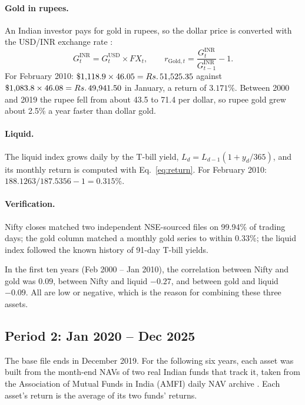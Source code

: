 \paragraph{Gold in rupees.} An Indian investor pays for gold in rupees, so the dollar price is
converted with the USD/INR exchange rate \citep{fred}:
\begin{equation}
  G^{\text{INR}}_t = G^{\text{USD}}_t \times FX_t, \qquad
  r_{\text{Gold},t} = \frac{G^{\text{INR}}_t}{G^{\text{INR}}_{t-1}} - 1 .
\end{equation}
For February 2010: $\$1{,}118.9 \times 46.05 = Rs.\,51{,}525.35$ against $\$1{,}083.8 \times 46.08
= Rs.\,49{,}941.50$ in January, a return of $3.171\%$. Between 2000 and 2019 the rupee fell from about
43.5 to 71.4 per dollar, so rupee gold grew about 2.5\% a year faster than dollar gold.

\paragraph{Liquid.} The liquid index grows daily by the T-bill yield,
$L_d = L_{d-1}(1 + y_d/365)$, and its monthly return is computed with Eq.~\eqref{eq:return}. For
February 2010: $188.1263 / 187.5356 - 1 = 0.315\%$.

\paragraph{Verification.} Nifty closes matched two independent NSE-sourced files on 99.94\% of trading days; the gold column matched a monthly gold series \citep{worldbank} to within 0.33\%; the liquid index followed the known history of 91-day T-bill yields.

In the first ten years (Feb 2000 -- Jan 2010), the correlation between Nifty and gold was $0.09$,
between Nifty and liquid $-0.27$, and between gold and liquid $-0.09$. All are low or negative, which
is the reason for combining these three assets.

\subsection{Period 2: Jan 2020 -- Dec 2025}

The base file ends in December 2019. For the following six years, each asset was built from the
month-end NAVs of two real Indian funds that track it, taken from the Association of Mutual Funds in
India (AMFI) daily NAV archive \citep{amfi}. Each asset's return is the average of its two funds'
returns.


